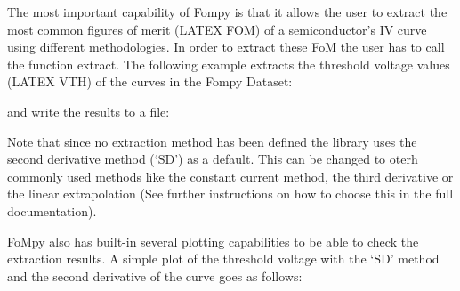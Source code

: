 \documentclass[letterpaper,10pt,english,openany, oneside]{sphinxmanual}
\begin{document}
The most important capability of Fompy is that it allows the user to extract the most common figures of merit (LATEX FOM)
of a semiconductor’s IV curve using different methodologies. In order to extract these FoM the user has to call the
function extract. The following example extracts the threshold voltage values (LATEX VTH) of the curves in the Fompy Dataset:

%
\begin{sphinxVerbatim}[commandchars=\\\{\}]
     
\end{sphinxVerbatim}

and write the results to a file:

%
\begin{sphinxVerbatim}[commandchars=\\\{\}]
  
\end{sphinxVerbatim}

Note that since no extraction method has been defined the library uses the second derivative method (‘SD’) as a default.
This can be changed to oterh commonly used methods like the constant current method, the third derivative or the linear extrapolation (See further instructions
on how to choose this in the full documentation).

FoMpy also has built-in several plotting capabilities to be able to check the extraction results. A simple plot
of the threshold voltage with the ‘SD’ method and the second derivative of the curve goes as follows:

%
\begin{sphinxVerbatim}[commandchars=\\\{\}]
    
\end{sphinxVerbatim}
\end{document}
